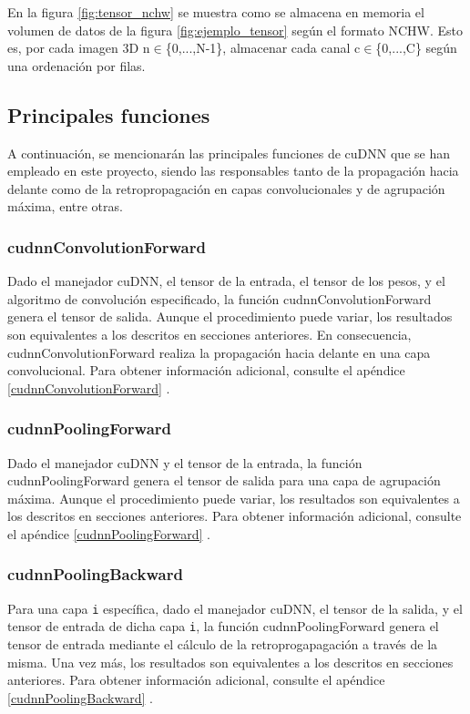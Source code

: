 En la figura \ref{fig:tensor_nchw} se muestra como se almacena en memoria el volumen de datos de la figura \ref{fig:ejemplo_tensor} según el formato NCHW. Esto es, por cada imagen 3D n$\in$\{0,...,N-1\}, almacenar cada canal c$\in$\{0,...,C\} según una ordenación por filas.

\subsection{Principales funciones}

A continuación, se mencionarán las principales funciones de cuDNN que se han empleado en este proyecto, siendo las responsables tanto de la propagación hacia delante como de la retropropagación en capas convolucionales y de agrupación máxima, entre otras.

\subsubsection{cudnnConvolutionForward}

Dado el manejador cuDNN, el tensor de la entrada, el tensor de los pesos, y el algoritmo de convolución especificado, la función cudnnConvolutionForward genera el tensor de salida. Aunque el procedimiento puede variar, los resultados son equivalentes a los descritos en secciones anteriores. En consecuencia, cudnnConvolutionForward realiza la propagación hacia delante en una capa convolucional. Para obtener información adicional, consulte el apéndice \ref{cudnnConvolutionForward} \cite{cuDNN_conv_fwd}.

\subsubsection{cudnnPoolingForward}

Dado el manejador cuDNN y el tensor de la entrada,  la función cudnnPoolingForward genera el tensor de salida para una capa de agrupación máxima. Aunque el procedimiento puede variar, los resultados son equivalentes a los descritos en secciones anteriores. Para obtener información adicional, consulte el apéndice \ref{cudnnPoolingForward} \cite{cuDNN_pool_fwd}.

\subsubsection{cudnnPoolingBackward}

Para una capa \texttt{i} específica, dado el manejador cuDNN, el tensor de la salida, y el tensor de entrada de dicha capa \texttt{i}, la función cudnnPoolingForward genera el tensor de entrada mediante el cálculo de la retroprogapagación a través de la misma. Una vez más, los resultados son equivalentes a los descritos en secciones anteriores. Para obtener información adicional, consulte el apéndice \ref{cudnnPoolingBackward} \cite{cuDNN_pool_fwd}.


